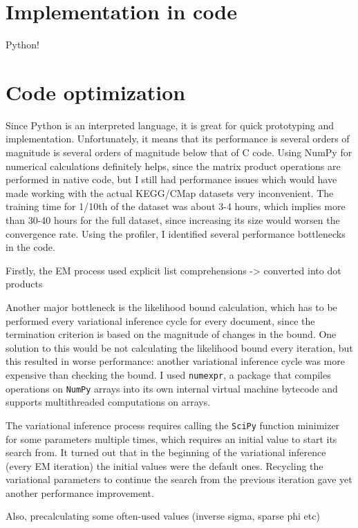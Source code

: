 \documentclass[12pt,a4paper,twoside,openright]{report}
\begin{document}
\section{Implementation in code}

Python!

\section{Code optimization}

Since Python is an interpreted language, it is great for quick prototyping and implementation. Unfortunately, it means that its performance is several orders of magnitude is several orders of magnitude below that of C code. Using NumPy for numerical calculations definitely helps, since the matrix product operations are performed in native code, but I still had performance issues which would have made working with the actual KEGG/CMap datasets very inconvenient. The training time for 1/10th of the dataset was about 3-4 hours, which implies more than 30-40 hours for the full dataset, since increasing its size would worsen the convergence rate. Using the profiler, I identified several performance bottlenecks in the code.

Firstly, the EM process used explicit list comprehensions -> converted into dot products

Another major bottleneck is the likelihood bound calculation, which has to be performed every variational inference cycle for every document, since the termination criterion is based on the magnitude of changes in the bound. One solution to this would be not calculating the likelihood bound every iteration, but this resulted in worse performance: another variational inference cycle was more expensive than checking the bound. I used \texttt{numexpr}, a package that compiles operations on \texttt{NumPy} arrays into its own internal virtual machine bytecode and supports multithreaded computations on arrays.

The variational inference process requires calling the \texttt{SciPy} function minimizer for some parameters multiple times, which requires an initial value to start its search from. It turned out that in the beginning of the variational inference (every EM iteration) the initial values were the default ones. Recycling the variational parameters to continue the search from the previous iteration gave yet another performance improvement.

Also, precalculating some often-used values (inverse sigma, sparse phi etc)
\end{document}
